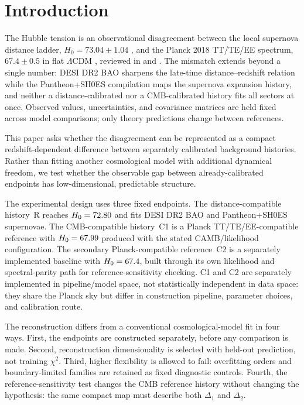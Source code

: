 \section{Introduction}
\label{sec:intro}

The Hubble tension is an observational disagreement between the local
supernova distance ladder,
$H_{0} = 73.04 \pm 1.04$\kmsMpc{} \citep{Riess2022}, and the Planck
2018 TT/TE/EE spectrum, $67.4 \pm 0.5$\kmsMpc{} in flat $\Lambda$CDM
\citep{Planck2018}, reviewed in \citet{Verde2019} and
\citet{KnoxMillea2020}. The mismatch extends beyond a single number:
DESI DR2 BAO \citep{DESIDR2} sharpens the late-time
distance--redshift relation while the Pantheon+SH0ES compilation
\citep{Scolnic2022,Brout2022} maps the supernova expansion history,
and neither a distance-calibrated nor a CMB-calibrated history fits
all sectors at once. Observed values, uncertainties, and covariance
matrices are held fixed across model comparisons; only theory
predictions change between references.

This paper asks whether the disagreement can be represented as a compact redshift-dependent difference between separately calibrated background histories. Rather than fitting
another cosmological model with additional dynamical freedom, we test
whether the observable gap between already-calibrated endpoints has
low-dimensional, predictable structure.

The experimental design uses three fixed endpoints. The
distance-compatible history~R reaches
$H_{0}=72.80$\kmsMpc{} and fits DESI DR2 BAO and
Pantheon+SH0ES supernovae. The CMB-compatible history~C1 is a Planck TT/TE/EE-compatible
reference with $H_{0}=67.99$\kmsMpc{} produced with the stated
CAMB/likelihood configuration. The secondary Planck-compatible reference~C2 is a
separately implemented baseline with
$H_{0}=67.4$\kmsMpc{}, built through its own likelihood and
spectral-parity path for reference-sensitivity checking. C1 and C2 are separately implemented in pipeline/model space, not statistically
independent in data space: they share the
Planck sky but differ in construction pipeline, parameter choices,
and calibration route.

The reconstruction differs from a conventional cosmological-model fit in four ways.
First, the endpoints are constructed separately, before any
comparison is made. Second, reconstruction dimensionality is selected with
held-out prediction, not training $\chi^{2}$. Third, higher
flexibility is allowed to fail: overfitting orders and
boundary-limited families are retained as fixed diagnostic
controls. Fourth, the reference-sensitivity test changes the CMB
reference history without changing the hypothesis: the same compact
map must describe both $\Delta_{1}$ and $\Delta_{2}$.

